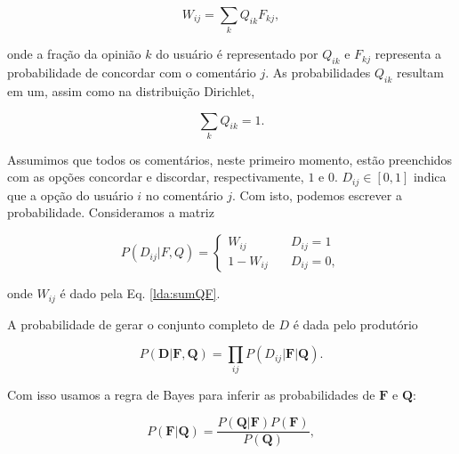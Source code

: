 \begin{equation} \label{lda:sumQF}
W_{ij} = \sum_{k} {Q}_{ik}{F}_{kj},
\end{equation}

\noindent
onde a fração da opinião $k$ do usuário é representado por ${Q}_{ik}$ e ${F}_{kj}$ representa a probabilidade de concordar com o comentário $j$. As probabilidades $Q_{ik}$ resultam em um, assim como na distribuição Dirichlet, 

\begin{equation}
\sum_{k} {Q}_{ik} = 1.
\end{equation}


Assumimos que todos os comentários, neste primeiro momento, estão preenchidos com as opções concordar e discordar, respectivamente, $1$ e $0$. ${D}_{ij} \in [0,1]$ indica que a opção do usuário $i$ no comentário $j$. 
Com isto, podemos escrever a probabilidade.
Consideramos a matriz



\begin{equation}
 P({D}_{ij}| {F}, {Q})= 
  \begin{cases}
     W_{ij} & \quad {D}_{ij} = 1  \\
     1-W_{ij} & \quad {D}_{ij} = 0,
  \end{cases}
\end{equation}

\noindent
onde $W_{ij}$ é dado pela Eq. \ref{lda:sumQF}.

A probabilidade de gerar o conjunto completo de $D$ é dada pelo produtório

\begin{equation}
P(\textbf{D}|\textbf{F},\textbf{Q}) = \prod_{ij} P(D_{ij}|\textbf{F}|\textbf{Q}).
\end{equation}

\noindent
Com isso usamos a regra de Bayes para inferir as probabilidades de $\textbf{F}$ e $\textbf{Q}$:

\begin{equation}
P(\textbf{F}|\textbf{Q}) = \frac{P(\textbf{Q}|\textbf{F})P(\textbf{F})}{P(\textbf{Q})},
\end{equation}

